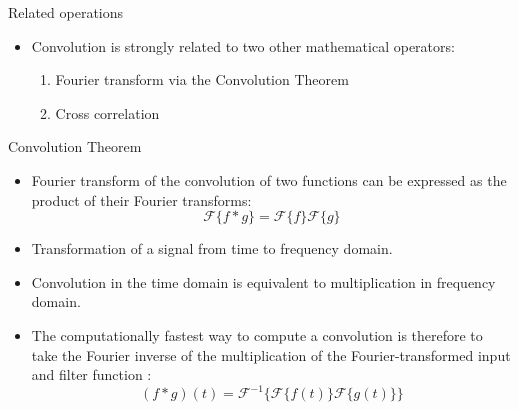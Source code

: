 \begin{vbframe}{Related operations}
    \begin{itemize}
        \item Convolution is strongly related to two other mathematical operators:
        \begin{enumerate}
            \item Fourier transform via the Convolution Theorem
            \item Cross correlation
        \end{enumerate}
    \end{itemize}
\end{vbframe}

\begin{vbframe}{Convolution Theorem}
    \begin{itemize}
        \item  Fourier transform of the convolution of two functions can be expressed as the product of their Fourier transforms:
        $$ 
            \mathcal{F} \{ f\ast g\} = \mathcal{F} \{f\}\mathcal{F} \{g\}
        $$
        \item Transformation of a signal from time to frequency domain.
        \item Convolution in the time domain is equivalent to multiplication in frequency domain.
        \item The computationally fastest way to compute a convolution is therefore to take the Fourier inverse of the multiplication of the Fourier-transformed input and filter function :
        $$
            (f \ast g)(t) = \mathcal{F}^{-1}\{\mathcal{F} \{f(t)\} \mathcal{F} \{g(t)\}\}
        $$
    \end{itemize}
\end{vbframe}

